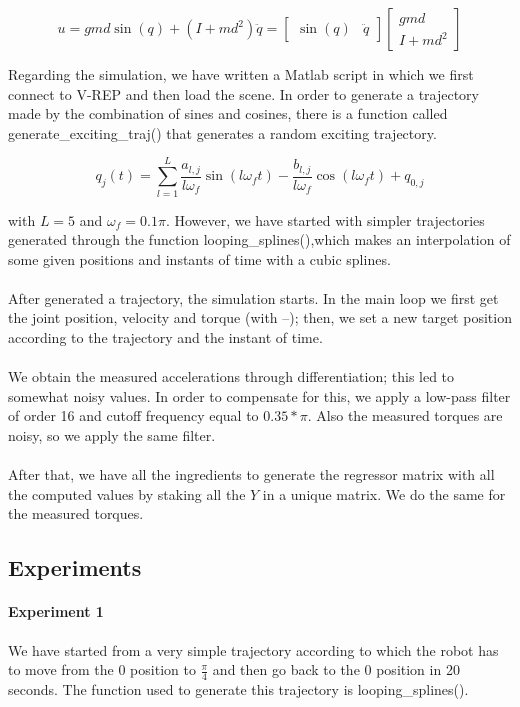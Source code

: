 \documentclass{article}
\begin{document}
\[u=gmd \sin(q) + (I+md^2)\ddot{q}= \begin{bmatrix}
\sin(q) & \ddot{q}
\end{bmatrix}\begin{bmatrix}
gmd \\ I +md^2
\end{bmatrix}\]

Regarding the simulation, we have written a Matlab script in which we first connect to V-REP and then load the scene. In order to generate a trajectory made by the combination of sines and cosines, there is a function called generate\_exciting\_traj() that generates a random exciting trajectory.

\[q_j(t) = \sum_{l=1}^{L}{\frac{ a_{l,j}}{ l\omega_f }\sin(l\omega_f t)-\frac{ b_{l,j}}{l\omega_f}\cos(l\omega_f t)+q_{0,j}}\]

\noindent with $L = 5$ and $\omega_f = 0.1\pi$. However, we have started with simpler trajectories generated through the function looping\_splines(),which makes an interpolation of some given positions and instants of time with a cubic splines.
\\\\
After generated a trajectory, the simulation starts. In the main loop we first get the joint position, velocity and torque (with –); then, we set a new target position according to the trajectory and the instant of time.
\\\\
We obtain the measured accelerations through differentiation; this led to somewhat noisy values. In order to compensate for this, we apply a low-pass filter of order 16 and cutoff frequency equal to $0.35*\pi$. Also the measured torques are noisy, so we apply the same filter.
\paragraph{}After that, we have all the ingredients to generate the regressor matrix with all the computed values by staking all the $Y$ in a unique matrix. We do the same for the measured torques.

\subsection{Experiments}
\paragraph{Experiment 1}We have started from a very simple trajectory according to which the robot has to move from the 0 position to $\frac{\pi}{4}$ and then go back to the 0 position in 20 seconds. The function used to generate this trajectory is looping\_splines().
\end{document}
